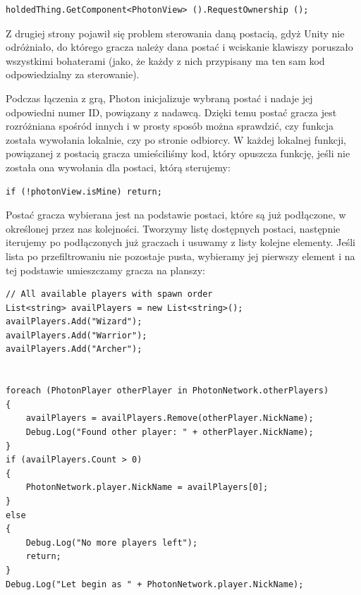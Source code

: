 \documentclass[openright]{xmgr}
\begin{document}
\begin{minipage}{\textwidth}
\begin{lstlisting}[caption={Funkcja przejmowania funkcji nadawania danych}]
holdedThing.GetComponent<PhotonView> ().RequestOwnership ();
\end{lstlisting}
\end{minipage}

      Z drugiej strony pojawił się problem sterowania daną postacią, gdyż Unity nie odróżniało, do którego gracza należy dana postać i wciskanie klawiszy poruszało wszystkimi bohaterami (jako, że każdy z nich przypisany ma ten sam kod odpowiedzialny za sterowanie).

      Podczas łączenia z grą, Photon inicjalizuje wybraną postać i nadaje jej odpowiedni numer ID, powiązany z nadawcą. Dzięki temu postać gracza jest rozróżniana spośród innych i w prosty sposób można sprawdzić, czy funkcja została wywołania lokalnie, czy po stronie odbiorcy. W każdej lokalnej funkcji, powiązanej z postacią gracza umieściliśmy kod, który opuszcza funkcję, jeśli nie została ona wywołania dla postaci, którą sterujemy:

\begin{minipage}{\textwidth}
\begin{lstlisting}[caption={Opuszczanie funkcji w przypadku, gdy postać gracza nie należy do nas}]
if (!photonView.isMine) return;
\end{lstlisting}
\end{minipage}

      Postać gracza wybierana jest na podstawie postaci, które są już podłączone, w określonej przez nas kolejności. Tworzymy listę dostępnych postaci, następnie iterujemy po podłączonych już graczach i usuwamy z listy kolejne elementy. Jeśli lista po przefiltrowaniu nie pozostaje pusta, wybieramy jej pierwszy element i na tej podstawie umieszczamy gracza na planszy:

\begin{minipage}{\textwidth}
\begin{lstlisting}[caption={Algorytm wybierania postaci gracza}]
// All available players with spawn order
List<string> availPlayers = new List<string>();
availPlayers.Add("Wizard"); 
availPlayers.Add("Warrior");
availPlayers.Add("Archer");


foreach (PhotonPlayer otherPlayer in PhotonNetwork.otherPlayers)
{
    availPlayers = availPlayers.Remove(otherPlayer.NickName);
    Debug.Log("Found other player: " + otherPlayer.NickName);
}
if (availPlayers.Count > 0)
{
    PhotonNetwork.player.NickName = availPlayers[0];
}
else
{
    Debug.Log("No more players left");
    return;
}
Debug.Log("Let begin as " + PhotonNetwork.player.NickName);
\end{lstlisting}
\end{minipage}
\end{document}
